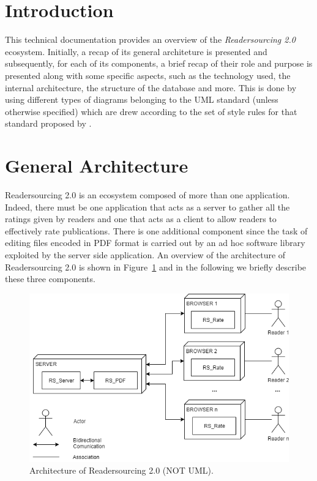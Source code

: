 \documentclass[a4paper, english]{article}
\begin{document}
\maketitle

\tableofcontents

\newpage

\listoffigures

\newpage

\listoftables

\newpage

\section{Introduction}

This technical documentation provides an overview of the \emph{Readersourcing 2.0} ecosystem. Initially, a recap of its general architeture is presented and subsequently, for each of its components, a brief recap of their role and purpose is presented along with some specific aspects, such as the technology used, the internal architecture, the structure of the database and more. This is done by using different types of diagrams belonging to the UML standard (unless otherwise specified) which are drew according to the set of style rules for that standard proposed by \citet{Fowler03}.

\section{General Architecture}

Readersourcing 2.0 is an ecosystem composed of more than one application. Indeed, there must be one application that acts as a server to gather all the ratings given by readers and one that acts as a client to allow readers to effectively rate publications. There is one additional component since the task of editing files encoded in PDF format is carried out by an ad hoc software library exploited by the server side application. An overview of the architecture of Readersourcing 2.0 is shown in Figure~\ref{fig:architecture} and in the following we briefly describe these three components. 

\begin{figure}[h]
\centering
\includegraphics[width=\textwidth]{figures/architecture.png}
\caption{Architecture of Readersourcing 2.0 (NOT UML).}
\label{fig:architecture}
\end{figure}
\end{document}
